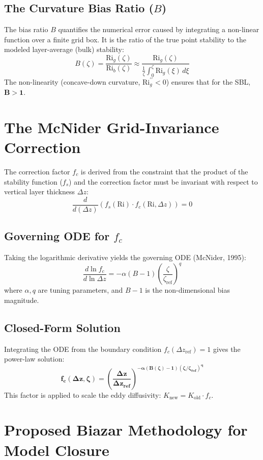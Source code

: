 \documentclass[12pt, a4paper]{article}
\begin{document}
\subsection{The Curvature Bias Ratio ($B$)}
The bias ratio $B$ quantifies the numerical error caused by integrating a non-linear function over a finite grid box. It is the ratio of the true point stability to the modeled layer-average (bulk) stability:
$$ B(\zeta) = \frac{\text{Ri}_g(\zeta)}{\text{Ri}_b(\zeta)} \approx \frac{\text{Ri}_g(\zeta)}{\frac{1}{\zeta} \int_0^\zeta \text{Ri}_g(\xi)\,d\xi} $$
The non-linearity (concave-down curvature, $\text{Ri}_g^{\prime\prime} < 0$) ensures that for the SBL, $\mathbf{B > 1}$.

\section{The McNider Grid-Invariance Correction}

The correction factor $f_c$ is derived from the constraint that the product of the stability function ($f_s$) and the correction factor must be invariant with respect to vertical layer thickness $\Delta z$:
$$ \frac{d}{d(\Delta z)} \left( f_s(\text{Ri}) \cdot f_c(\text{Ri}, \Delta z) \right) = 0 $$

\subsection{Governing ODE for $f_c$}
Taking the logarithmic derivative yields the governing ODE (McNider, 1995):
$$ \frac{d \ln f_c}{d \ln \Delta z} = -\alpha (B-1) \left(\frac{\zeta}{\zeta_{\text{ref}}}\right)^q $$
where $\alpha, q$ are tuning parameters, and $B-1$ is the non-dimensional bias magnitude.

\subsection{Closed-Form Solution}
Integrating the ODE from the boundary condition $f_c(\Delta z_{\text{ref}}) = 1$ gives the power-law solution:
$$ \mathbf{f_c(\Delta z,\zeta) = \left(\frac{\Delta z}{\Delta z_{\text{ref}}}\right)^{-\alpha (B(\zeta)-1)(\zeta/\zeta_{\text{ref}})^q}} $$
This factor is applied to scale the eddy diffusivity: $K_{\text{new}} = K_{\text{old}} \cdot f_c$.

\section{Proposed Biazar Methodology for Model Closure}
\end{document}

